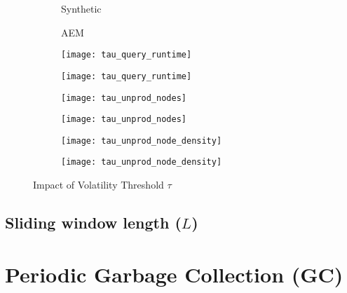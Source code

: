 \documentclass[abstracton,12pt]{scrartcl}
\theoremstyle{definition}
\begin{document}
\begin{figure}[h]
  \centering
  \begin{subfigure}{0.49\linewidth}
    \centering
    Synthetic
  \end{subfigure}
  \begin{subfigure}{0.49\linewidth}
    \centering
    AEM
  \end{subfigure}
  \begin{subfigure}{0.49\linewidth}
    \centering
    \texttt{[image: tau\_query\_runtime]}
    \caption{}
    \label{fig:tau_query_runtime_synthetic}
  \end{subfigure}
  \begin{subfigure}{0.49\linewidth}
    \centering
    \texttt{[image: tau\_query\_runtime]}
    \caption{}
    \label{fig:tau_query_runtime_aem}
  \end{subfigure}
  \begin{subfigure}{0.49\linewidth}
    \centering
    \texttt{[image: tau\_unprod\_nodes]}
    \caption{}
    \label{fig:tau_unprod_nodes_synthetic}
  \end{subfigure}
  \begin{subfigure}{0.49\linewidth}
    \centering
    \texttt{[image: tau\_unprod\_nodes]}
    \caption{}
    \label{fig:tau_unprod_nodes_aem}
  \end{subfigure}
  \begin{subfigure}{0.49\linewidth}
    \centering
    \texttt{[image: tau\_unprod\_node\_density]}
    \caption{}
    \label{fig:tau_unprod_node_density_synthetic}
  \end{subfigure}
  \begin{subfigure}{0.49\linewidth}
    \centering
    \texttt{[image: tau\_unprod\_node\_density]}
    \caption{}
    \label{fig:tau_unprod_node_density_aem}
  \end{subfigure}
  \caption{Impact of Volatility Threshold $\tau$}
  \label{fig:vol_thresh_2}
\end{figure}

\subsection{Sliding window length ($L$)}



\section{Periodic Garbage Collection (GC)}
\end{document}
